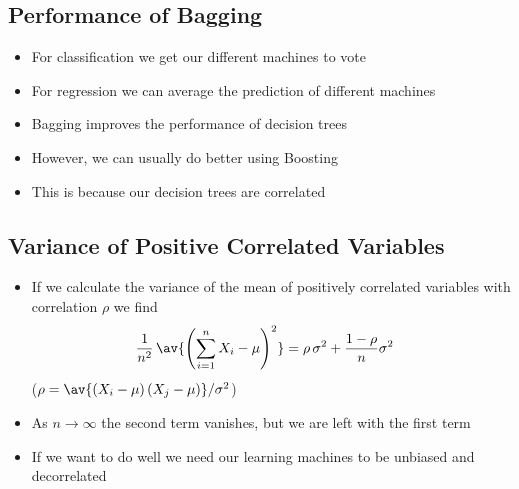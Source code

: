 
\begin{slide}
\section{Performance of Bagging}

\begin{PauseHighLight}
  \begin{itemize}
  \item For classification we get our different machines to vote\pause
  \item For regression we can average the prediction of different
    machines\pause
  \item Bagging improves the performance of decision trees\pause
  \item However, we can usually do better using Boosting\pause
  \item This is because our decision trees are correlated\pause
  \end{itemize}
\end{PauseHighLight}

\end{slide}



\begin{slide}
\section{Variance of Positive Correlated Variables}

\begin{PauseHighLight}
  \begin{itemize}
  \item If we calculate the variance of the mean of positively correlated
    variables with correlation $\rho$ we find
    \begin{align*}
      \frac{1}{n^2} \, \av{ \left(\sum_{i=1}^n X_i -\mu\right)^2}
      &= \rho\,\sigma^2 + \frac{1-\rho}{n} \sigma^2
    \end{align*}
  ($\rho = \av{(X_i-\mu)\,(X_j-\mu)}/\sigma^2$)\pause
  \item As $n\rightarrow\infty$ the second term vanishes, but we are left
    with the first term\pause
  \item If we want to do well we need our learning machines to be
    unbiased and decorrelated\pause
  \end{itemize}
\end{PauseHighLight}


\end{slide}



